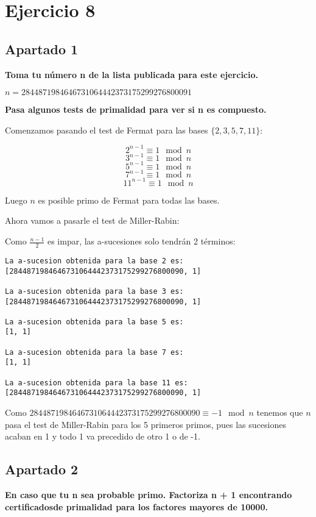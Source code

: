 \documentclass[a4paper]{article}
\title {\fbox{\Huge{\textbf{Ejercicio 8}}}}
\author {\fbox{Ana Buendía Ruiz-Azuaga}}
\begin{document}
\maketitle


\section{Ejercicio 8}

\subsection{Apartado 1}

\textbf{Toma tu número n de la lista publicada para este ejercicio.}

$n = 2844871984646731064442373175299276800091$

\textbf{Pasa algunos tests de primalidad para ver si n es compuesto.}

Comenzamos pasando el test de Fermat para las bases $\{2,3,5,7,11\}$:

$$2^{n-1}\equiv 1\mod n$$
$$3^{n-1}\equiv 1\mod n$$
$$5^{n-1}\equiv 1\mod n$$
$$7^{n-1}\equiv 1\mod n$$
$$11^{n-1}\equiv 1\mod n$$

Luego $n$ es posible primo de Fermat para todas las bases.

Ahora vamos a pasarle el test de Miller-Rabin:

Como $\frac{n-1}{2}$ es impar, las a-sucesiones solo tendrán 2 términos:

\begin{verbatim}
La a-sucesion obtenida para la base 2 es:
[2844871984646731064442373175299276800090, 1]

La a-sucesion obtenida para la base 3 es:
[2844871984646731064442373175299276800090, 1]

La a-sucesion obtenida para la base 5 es:
[1, 1]

La a-sucesion obtenida para la base 7 es:
[1, 1]

La a-sucesion obtenida para la base 11 es:
[2844871984646731064442373175299276800090, 1]
\end{verbatim}

Como $2844871984646731064442373175299276800090\equiv -1 \mod n$ tenemos que $n$ pasa el test de Miller-Rabin para los 5 primeros primos, pues las sucesiones acaban en 1 y todo 1 va precedido de otro 1 o de -1.

\subsection{Apartado 2}
\textbf{En caso que tu n sea probable primo. Factoriza n + 1 encontrando certificadosde primalidad para los factores mayores de 10000.}
\end{document}
